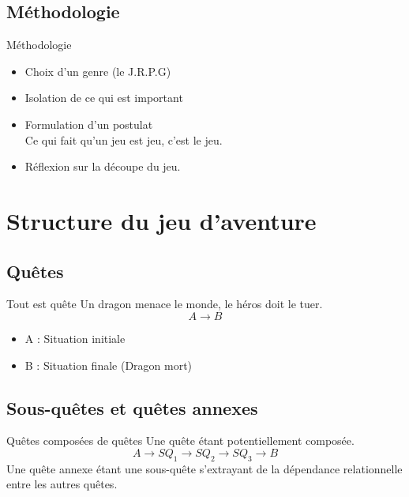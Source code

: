 \documentclass{beamer}
\begin{document}
\subsection{Méthodologie}
\begin{frame}{Méthodologie}
  \begin{itemize}
    \item Choix d'un genre (le J.R.P.G)
    \item Isolation de ce qui est important
    \item Formulation d'un postulat \\ 
      Ce qui fait qu'un jeu est jeu, c'est le jeu.
    \item Réflexion sur la découpe du jeu.
  \end{itemize}
\end{frame}

\section{Structure du jeu d'aventure}
\subsection{Quêtes}
\begin{frame}{Tout est quête}
Un dragon menace le monde, le héros doit le tuer. 
  \newline
  $$A \rightarrow B$$
  \begin{itemize}
    \item A : Situation initiale
    \item B : Situation finale (Dragon mort)
  \end{itemize}
\end{frame}

\subsection{Sous-quêtes et quêtes annexes}
\begin{frame}{Quêtes composées de quêtes}
  Une quête étant potentiellement composée.
  \newline
  $$A \rightarrow SQ_1 \rightarrow SQ_2 \rightarrow SQ_3 \rightarrow B $$
  \newline
  Une quête annexe étant une sous-quête s'extrayant de la dépendance relationnelle entre les autres quêtes.
\end{frame}
\end{document}
